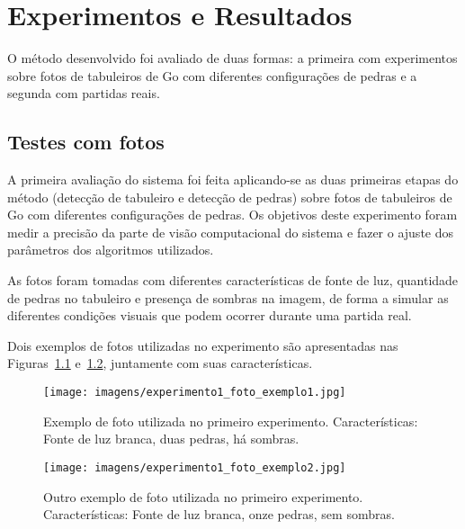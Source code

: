 \chapter[Experimentos e Resultados]{Experimentos e Resultados}

O método desenvolvido foi avaliado de duas formas: a primeira com experimentos sobre fotos de tabuleiros de Go com diferentes configurações de pedras e a segunda com partidas reais.

\section{Testes com fotos}

A primeira avaliação do sistema foi feita aplicando-se as duas primeiras etapas do método (detecção de tabuleiro e detecção de pedras) sobre fotos de tabuleiros de Go com diferentes configurações de pedras. Os objetivos deste experimento foram medir a precisão da parte de visão computacional do sistema e fazer o ajuste dos parâmetros dos algoritmos utilizados.

As fotos foram tomadas com diferentes características de fonte de luz, quantidade de pedras no tabuleiro e presença de sombras na imagem, de forma a simular as diferentes condições visuais que podem ocorrer durante uma partida real.

Dois exemplos de fotos utilizadas no experimento são apresentadas nas Figuras~\ref{fig:experimento1-foto-exemplo1} e~\ref{fig:experimento1-foto-exemplo2}, juntamente com suas características.

\begin{figure}[tbh]
\texttt{[image: imagens/experimento1\_foto\_exemplo1.jpg]}
\centering
\caption[Exemplo de foto utilizada no primeiro experimento]{Exemplo de foto utilizada no primeiro experimento. Características: Fonte de luz branca, duas pedras, há sombras.}
\label{fig:experimento1-foto-exemplo1}
\end{figure}

\begin{figure}[tbh]
\texttt{[image: imagens/experimento1\_foto\_exemplo2.jpg]}
\centering
\caption[Outro exemplo de foto utilizada no primeiro experimento]{Outro exemplo de foto utilizada no primeiro experimento. Características: Fonte de luz branca, onze pedras, sem sombras.}
\label{fig:experimento1-foto-exemplo2}
\end{figure}


